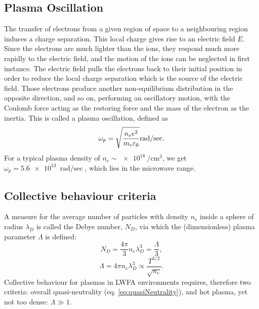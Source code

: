 \documentclass[../main.tex]{subfiles}
\begin{document}
\subsection{Plasma Oscillation}\label{ssec:oscillation}
The transfer of electrons from a given region of space to a neighbouring region induces a charge separation. This local charge gives rise to an electric field $E$. Since the electrons are much lighter than the ions, they respond much more rapidly to the electric field, and the motion of the ions can be neglected in first instance. The electric field pulls the electrons back to their initial position in order to reduce the local charge separation which is the source of the electric field. Those electrons produce another non-equilibrium distribution in the opposite direction, and so on, performing an oscillatory motion, with the Coulomb force acting as the restoring force and the mass of the electron as the inertia. This is called a plasma oscillation, defined as
\begin{equation}
		\omega_p=\sqrt{\frac{n_e e^2}{m_e \varepsilon_0}}\si[per-mode=fraction]{\radian\per\sec}.\label{eq:plasma-frequency}
\end{equation}
For a typical plasma density of $n_e \sim \SI{e18}{\per\cubic\cm}$, we get \\ $\omega_p=\SI{5.6e13}{\radian\per\sec}$, which lies in the microwave range.

\subsection{Collective behaviour criteria}
A measure for the average number of particles with density $n_e$ inside a sphere of radius $\lambda_D$ is called the Debye number, $N_D$, via which the (dimensionless) plasma parameter $\Lambda$ is defined:
$$
    N_D=\frac{4\pi}{3}n_e \lambda_D^3=\frac{\Lambda}{3},
$$
\begin{equation}
    \Lambda=4\pi n_e \lambda_D^3 \propto \frac{T^{3/2}}{\sqrt{n_e}}.
\end{equation}
Collective behaviour for plasmas in LWFA environments requires, therefore two criteria: overall quasi-neutrality (eq. \ref{eq:quasiNeutrality}), and hot plasma, yet not too dense: $\Lambda \gg 1$.
\end{document}
